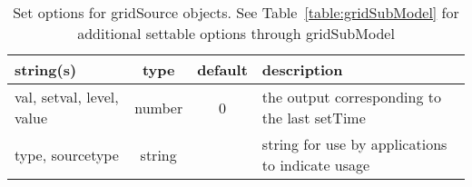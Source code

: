\begin{table}[ht]
\centering
\begin{tabular}{p{5cm} c c p{7cm}}
\hline
string(s) & type & default & description \\
\hline
val, setval, level, value & number & 0 & the output corresponding to the last setTime\\
type, sourcetype & string &  & string for use by applications to indicate usage\\
\hline
\end{tabular}
\caption{Set options for gridSource objects. See Table~\ref{table:gridSubModel} for additional settable options through gridSubModel}
\label{table:gridSource}
\end{table}
